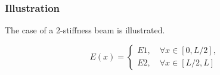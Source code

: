 \subsubsection{Illustration}
\label{1D_NeuROM_Bi}
The case of a 2-stiffness beam is illustrated.


$$
E(x) =
\begin{cases}
E1,\quad \forall x \in \left[0,L/2\right],\\
E2,\quad \forall x \in \left[L/2,L\right]

\end{cases}
$$

